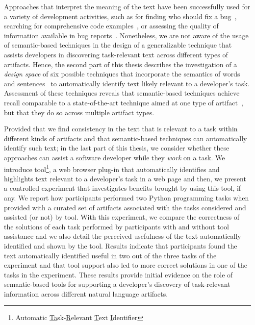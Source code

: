 Approaches that interpret the meaning of the text have been successfully used for a variety of development activities,
such as for finding who should fix a bug~\cite{yang2016}, searching for comprehensive code examples~\cite{silva2019}, or assessing the quality of information available in bug reports~\cite{chaparro2019}.
Nonetheless, we are not aware of the usage of semantic-based techniques in the design of a generalizable technique that assists developers in discovering task-relevant text across different types of artifacts.
Hence, the second part of this thesis describes 
the investigation of a \textit{design space}
of six possible techniques that incorporate the semantics of words~\cite{Mikolov2013, Devlin2018Bert}
and sentences~\cite{fillmore1976frame, marques2021}
to automatically identify text likely relevant to a developer's task.
Assessment of these techniques reveals that semantic-based techniques
achieve recall comparable to a state-of-the-art technique aimed at one type of artifact~\cite{Xu2017}, but 
that they do so across
multiple artifact types.








Provided that we find consistency in the text  that is relevant to a task within different kinds of artifacts and that semantic-based techniques can automatically identify such text; in the last part of this thesis, 
we consider whether these approaches can assist a software developer while they \textit{work} on a task.
We introduce \acs{tool}\footnote{
    Automatic \underline{Ta}sk-\underline{R}elevant \underline{T}ext \underline{I}dentifier
}, a web browser plug-in that 
automatically identifies and highlights text relevant to a developer's task in a web page 
and then, we present a controlled experiment that investigates benefits brought by using this tool, if any.
We report how  participants 
performed two Python programming tasks when 
provided with a
 curated set of artifacts associated with the tasks considered
 and assisted (or not) by \acs{tool}.
With this experiment, we compare the correctness of the solutions of each task 
performed by participants with and without tool assistance
and we also detail
the perceived usefulness of the text automatically identified and shown by the tool. 
Results indicate that participants found the text automatically identified
useful in two out of the three tasks of the experiment
and that tool support also led to more correct solutions 
in one of the tasks in the experiment. These results provide
initial evidence on the role of semantic-based tools 
for supporting a developer's discovery of task-relevant information
across different natural language artifacts.



